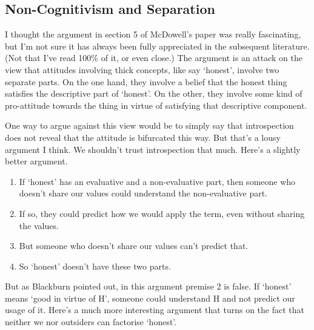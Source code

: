 \documentclass[
]{article}
\providecommand{\tightlist}{%
  \setlength{\itemsep}{0pt}\setlength{\parskip}{0pt}}
\begin{document}
\newpage

\hypertarget{non-cognitivism-and-separation}{%
\subsection{Non-Cognitivism and
Separation}\label{non-cognitivism-and-separation}}

I thought the argument in section 5 of McDowell's paper was really
fascinating, but I'm not sure it has always been fully appreciated in
the subsequent literature. (Not that I've read 100\% of it, or even
close.) The argument is an attack on the view that attitudes involving
thick concepts, like say `honest', involve two separate parts. On the
one hand, they involve a belief that the honest thing satisfies the
descriptive part of `honest'. On the other, they involve some kind of
pro-attitude towards the thing in virtue of satisfying that descriptive
component.

One way to argue against this view would be to simply say that
introspection does not reveal that the attitude is bifurcated this way.
But that's a lousy argument I think. We shouldn't trust introspection
that much. Here's a slightly better argument.

\begin{enumerate}
\def\labelenumi{\arabic{enumi}.}
\tightlist
\item
  If `honest' has an evaluative and a non-evaluative part, then someone
  who doesn't share our values could understand the non-evaluative part.
\item
  If so, they could predict how we would apply the term, even without
  sharing the values.
\item
  But someone who doesn't share our values can't predict that.
\item
  So `honest' doesn't have these two parts.
\end{enumerate}

But as Blackburn pointed out, in this argument premise 2 is false. If
`honest' means `good in virtue of H', someone could understand H and not
predict our usage of it. Here's a much more interesting argument that
turns on the fact that neither we nor outsiders can factorise `honest'.
\end{document}
